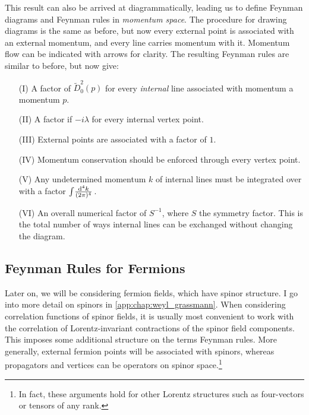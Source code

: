 \documentclass[../main.tex]{subfiles}
\begin{document}
This result can also be arrived at diagrammatically, leading us to define Feynman diagrams and Feynman rules in \emph{momentum space}.
The procedure for drawing diagrams is the same as before, but now every external point is associated with an external momentum, and every line carries momentum with it.
Momentum flow can be indicated with arrows for clarity.
The resulting Feynman rules are similar to before, but now give:
\begin{itemize}
  \item [(I)] A factor of \(\tilde{D}_0^2(p)\) for every \emph{internal} line associated with momentum a momentum \(p\).
  \item [(II)] A factor if \(-i\lambda\) for every internal vertex point.
  \item [(III)] External points are associated with a factor of \(1\).
  \item [(IV)] Momentum conservation should be enforced through every vertex point.
  \item [(V)] Any undetermined momentum \(k\) of internal lines must be integrated over with a factor \(\int\!\frac{\mathrm{d}^{4}k}{(2\pi)^{4}}\,\).
  \item [(VI)] An overall numerical factor of \(S^{-1}\), where \(S\) the symmetry factor. This is the total number of ways internal lines can be exchanged without changing the diagram.
\end{itemize}


\subsection{Feynman Rules for Fermions}
Later on, we will be considering fermion fields, which have spinor structure.
I go into more detail on spinors in \cref{app:chap:weyl_grassmann}.
When considering correlation functions of spinor fields, it is usually most convenient to work with the correlation of Lorentz-invariant contractions of the spinor field components.
This imposes some additional structure on the terms Feynman rules.
More generally, external fermion points will be associated with spinors, whereas propagators and vertices can be operators on spinor space.\footnote{In fact, these arguments hold for other Lorentz structures such as four-vectors or tensors of any rank.}
\end{document}
